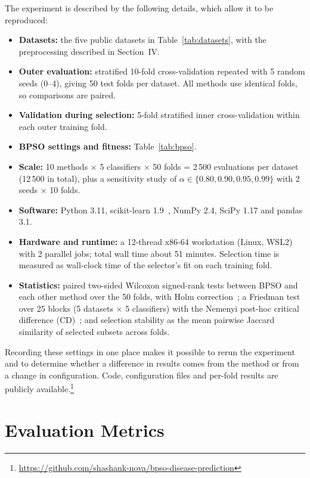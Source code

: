 \documentclass[conference]{IEEEtran}
\begin{document}
The experiment is described by the following details, which allow it to be
reproduced:
\begin{itemize}
\item \textbf{Datasets:} the five public datasets in
Table~\ref{tab:datasets}, with the preprocessing described in Section~IV.
\item \textbf{Outer evaluation:} stratified 10-fold cross-validation repeated
with 5 random seeds (0--4), giving 50 test folds per dataset. All methods use
identical folds, so comparisons are paired.
\item \textbf{Validation during selection:} 5-fold stratified inner
cross-validation within each outer training fold.
\item \textbf{BPSO settings and fitness:} Table~\ref{tab:bpso}.
\item \textbf{Scale:} 10 methods $\times$ 5 classifiers $\times$ 50 folds =
2\,500 evaluations per dataset (12\,500 in total), plus a sensitivity study of
$\alpha \in \{0.80, 0.90, 0.95, 0.99\}$ with 2 seeds $\times$ 10 folds.
\item \textbf{Software:} Python 3.11, scikit-learn 1.9~\cite{pedregosa2011},
NumPy 2.4, SciPy 1.17 and pandas 3.1.
\item \textbf{Hardware and runtime:} a 12-thread x86-64 workstation (Linux,
WSL2) with 2 parallel jobs; total wall time about 51 minutes. Selection time
is measured as wall-clock time of the selector's fit on each training fold.
\item \textbf{Statistics:} paired two-sided Wilcoxon signed-rank tests between
BPSO and each other method over the 50 folds, with Holm
correction~\cite{holm1979}; a Friedman test over 25 blocks (5 datasets
$\times$ 5 classifiers) with the Nemenyi post-hoc critical difference
(CD)~\cite{demsar2006}; and selection stability as the mean pairwise Jaccard
similarity of selected subsets across folds.
\end{itemize}
Recording these settings in one place makes it possible to rerun the
experiment and to determine whether a difference in results comes from the
method or from a change in configuration. Code, configuration files and
per-fold results are publicly available.\footnote{\url{https://github.com/shashank-nova/bpso-disease-prediction}}

\section{Evaluation Metrics}
\end{document}
